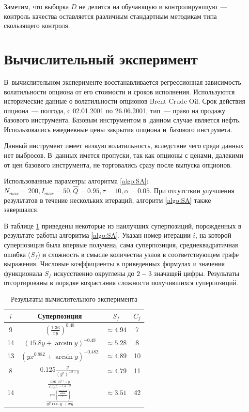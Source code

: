 \documentclass[12pt,a4paper]{amsart}
\begin{document}
Заметим, что выборка $D$ не делится на обучающую и контролирующую~--- контроль
качества оставляется различным стандартным методикам типа скользящего контроля.

\section{Вычислительный эксперимент}

В~вычислительном эксперименте восстанавливается регрессионная зависимость
волатильности опциона от его стоимости и сроков исполнения. Используются
исторические данные о волатильности опционов Brent Crude Oil. Срок действия
опциона~--- полгода, с 02.01.2001 по 26.06.2001, тип~--- право на продажу
базового инструмента. Базовым инструментом в~данном случае является нефть.
Использовались ежедневные цены закрытия опциона и~базового инструмета.

Данный инструмент имеет низкую волатильность, вследствие чего среди данных
нет выбросов. В~данных имется пропуски, так как опционы с ценами, далекими
от цен базового инструмента, не торговались сразу после выпуска опционов.

Использованные параметры алгоритма \ref{algo:SA}: $N_{max} = 200, I_{max} = 50,
\hat{Q} = 0.95, \tau = 10, \alpha = 0.05$. При отсутствии улучшения результатов
в течение нескольких итераций, алгоритм \ref{algo:SA} также завершался.

В таблице \ref{tabl:results} приведены некоторые из наилучших суперпозиций,
порожденных в результате работы алгоритма \ref{algo:SA}. Указан номер
итерации $i$, на которой суперпозиция была впервые получена, сама суперпозиция,
среднеквадратичная ошибка ($S_f$) и сложность в смысле количества узлов в
соответствующем графе выражения. Числовые коэффициенты в приведенных формулах
и значения функционала $S_f$ искусственно округлены до $2-3$ значащей цифры.
Результаты отсортированы в порядке возрастания сложности получившихся
суперпозиций.

\begin{table}[h]
  \begin{tabular}{| c | c | c | c |} \hline
	$i$ & Суперпозиция													& $S_f$				& $C_f$ \\ \hline
	9	& $\displaystyle \left(\frac{1.36}{xy}\right)^{0.48}$			& $\approx 4.94$	& 7		\\ \hline
	14	& $\displaystyle (15.8y + \arcsin y)^{-0.48}$					& $\approx 5.28$	& 8		\\ \hline
	13	& $\displaystyle (yx^{0.882} + \arcsin y)^{-0.482}$				& $\approx 4.89$	& 10	\\ \hline
	8	& $\displaystyle 0.125 \frac{y}{(y^2)^{0.8+y}}$					& $\approx 4.79$	& 11	\\ \hline
	14	& $\displaystyle \frac{\frac{3.86 \cdot 10^{11} + y}{\frac{y\frac{1.227 \cdot 10^{11}}{x^y}-2.46 \cdot 10^{8}}{y \cos \left(\frac{\frac{-5.89 \cdot 10^{-3}+y}{\frac{y - 5.47 \cdot 10^{-3}}{y \cos y}}}{y}\right)}}}{y^y \cos y + xy}$	& $\approx 3.51$	& 42		\\ \hline
  \end{tabular}
  \label{tabl:results}
  \caption{Результаты вычислительного эксперимента}
\end{table}
\end{document}
